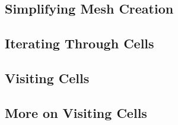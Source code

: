 


\subsection{Simplifying Mesh Creation}
\label{sec:AutomaticMesh}




\subsection{Iterating Through Cells}
\label{sec:MeshCellsIteration}




\subsection{Visiting Cells}
\label{sec:MeshCellVisitor}




\subsection{More on Visiting Cells}
\label{sec:MeshCellVisitorMultipleType}




